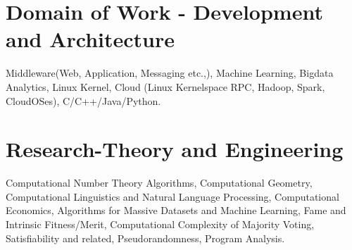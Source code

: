 \documentclass[11pt,onecolumn]{article}
\begin{document}
\section{Domain of Work - Development and Architecture}
Middleware(Web, Application, Messaging etc.,), Machine Learning, Bigdata Analytics, Linux Kernel, Cloud (Linux Kernelspace RPC, Hadoop, Spark, CloudOSes), C/C++/Java/Python.

\section{Research-Theory and Engineering}
Computational Number Theory Algorithms, Computational Geometry, Computational Linguistics and Natural Language Processing, Computational Economics, Algorithms for Massive Datasets and Machine Learning, Fame and Intrinsic Fitness/Merit, Computational Complexity of Majority Voting, Satisfiability and related, Pseudorandomness, Program Analysis.
\end{document}
